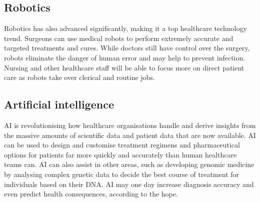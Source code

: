 \documentclass[12pt]{article}
\begin{document}
\subsection{Robotics}
Robotics has also advanced significantly, making it a top healthcare technology trend. Surgeons can use medical robots to perform extremely accurate and targeted treatments and cures. While doctors still have control over the surgery, robots eliminate the danger of human error and may help to prevent infection. Nursing and other healthcare staff will be able to focus more on direct patient care as robots take over clerical and routine jobs.
\subsection{Artificial intelligence}
AI is revolutionising how healthcare organisations handle and derive insights from the massive amounts of scientific data and patient data that are now available. AI can be used to design and customise treatment regimens and pharmaceutical options for patients far more quickly and accurately than human healthcare teams can. AI can also assist in other areas, such as developing genomic medicine by analysing complex genetic data to decide the best course of treatment for individuals based on their DNA. AI may one day increase diagnosis accuracy and even predict health consequences, according to the hope.
\end{document}
